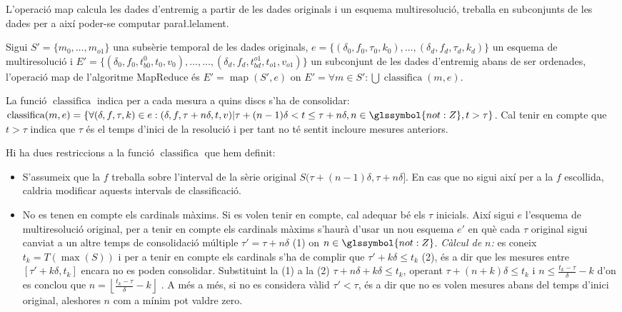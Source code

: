 L'operació map calcula les dades d'entremig a partir de les dades
originals i un esquema multiresolució, treballa en subconjunts de les
dades per a així poder-se computar para\l.lelament.
\begin{definition}
  Sigui $S'=\{m_0,\dotsc,m_{o1}\}$ una subsèrie temporal de les dades
  originals, $e=\{ (\delta_0,f_0,\tau_0,k_0),\ldots,
  (\delta_d,f_d,\tau_d,k_d)\}$ un esquema de multiresolució i
  $E'=\{(\delta_0,f_0, t_{b0}^0, t_0,v_0),\dotsc, \dotsc,
  (\delta_d,f_d, t_{bd}^{o1}, t_{o1},v_{o1}) \}$ un subconjunt de les
  dades d'entremig abans de ser ordenades, l'operació map de
  l'algoritme MapReduce és $E'=\operatorname{map}(S',e)$ on $E'=
  \forall m \in S': \bigcup\operatorname{classifica}(m,e)$.

  La funció $\operatorname{classifica}$ indica per a cada mesura a quins
  discs s'ha de consolidar: $\operatorname{classifica}(m,e)=\{ \forall
  (\delta,f,\tau,k) \in e: (\delta,f,\tau+n\delta,t,v) |
  \tau+(n-1)\delta < t \leq \tau+n\delta, n\in\glssymbol{not:Z}, t >
  \tau \}$. Cal tenir en compte que $t > \tau$ indica que $\tau$ és el temps
  d'inici de la resolució i per tant no té sentit incloure mesures
  anteriors.
\end{definition}






Hi ha dues restriccions a la funció $\operatorname{classifica}$ que
hem definit: 
\begin{itemize}

\item S'assumeix que la $f$ treballa sobre l'interval de la sèrie
  original $S(\tau+(n-1)\delta ,\tau+n\delta]$. En cas que no sigui
  així per a la $f$ escollida, caldria modificar aquests intervals de
  classificació.

\item No es tenen en compte els cardinals màxims. Si es volen tenir en
  compte, cal adequar bé els $\tau$ inicials. Així sigui $e$ l'esquema
  de multiresolució original, per a tenir en compte els cardinals
  màxims s'haurà d'usar un nou esquema $e'$ en què cada $\tau$
  original sigui canviat a un altre temps de consolidació múltiple
  $\tau'= \tau+n\delta$ (1) on $n\in\glssymbol{not:Z}$.  \emph{Càlcul
    de $n$:} es coneix $t_k=T(\max(S))$ i per a tenir en compte els
  cardinals s'ha de complir que $\tau'+k\delta \leq t_k$ (2), és a dir
  que les mesures entre $[\tau'+k\delta,t_k]$ encara no es poden
  consolidar.  Substituint la (1) a la (2) $\tau+n\delta+k\delta \leq
  t_k$, operant $\tau+(n+k)\delta \leq t_k$ i $n \leq
  \frac{t_k-\tau}{\delta}-k$ d'on es conclou que $n = \left\lfloor
    \frac{t_k-\tau}{\delta}-k \right\rfloor$ .  A més a més, si no es
  considera vàlid $\tau'<\tau$, és a dir que no es volen mesures abans
  del temps d'inici original, aleshores $n$ com a mínim pot valdre
  zero.

\end{itemize}



